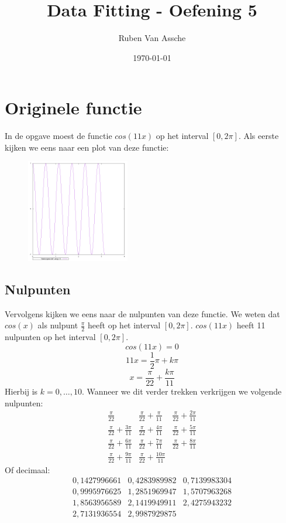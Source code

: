 \documentclass[10pt,a4paper,twocolumn]{article}
\author{Ruben Van Assche}
\title{Data Fitting - Oefening 5}
\date{\today}
\begin{document}
\maketitle
\section{Originele functie}
In de opgave moest de functie $cos(11x)$ op het interval $[0,2 \pi]$. Als eerste kijken we eens naar een plot van deze functie:
\begin{figure}[H]
\includegraphics[width=0.4\textwidth]{original-3}
\end{figure}
\subsection{Nulpunten}
Vervolgens kijken we eens naar de nulpunten van deze functie. We weten dat $cos(x)$ als nulpunt $\frac{\pi}{2}$ heeft op het interval  $[0,2 \pi]$. $cos(11x)$ heeft 11 nulpunten op het interval $[0,2 \pi]$. 
$$cos(11x) = 0$$
$$11x = \frac{1}{2} \pi + k \pi$$
$$x = \frac{\pi}{22} +\frac{k \pi}{11}$$
Hierbij is $k = 0,\hdots,10$. Wanneer we dit verder trekken verkrijgen we volgende nulpunten:
$$
\begin{matrix}
\frac{\pi}{22}  &  \frac{\pi}{22} +\frac{\pi}{11} & \frac{\pi}{22} +\frac{2 \pi}{11} \\ 
\frac{\pi}{22} +\frac{3 \pi}{11} & \frac{\pi}{22} +\frac{4 \pi}{11} &  \frac{\pi}{22} +\frac{5 \pi}{11}\\ 
\frac{\pi}{22} +\frac{6 \pi}{11} & \frac{\pi}{22} +\frac{7 \pi}{11}  & \frac{\pi}{22} +\frac{8 \pi}{11} \\
\frac{\pi}{22} +\frac{9 \pi}{11} & \frac{\pi}{22} +\frac{10 \pi}{11} &
\end{matrix}
$$
Of decimaal:
$$
\begin{matrix}
0,1427996661 &  0,4283989982 & 0,7139983304 \\
0,9995976625 & 1,2851969947 & 1,5707963268 \\
1,8563956589 & 2,1419949911 & 2,4275943232 \\
2,7131936554 & 2,9987929875& 
\end{matrix}
$$
\end{document}
